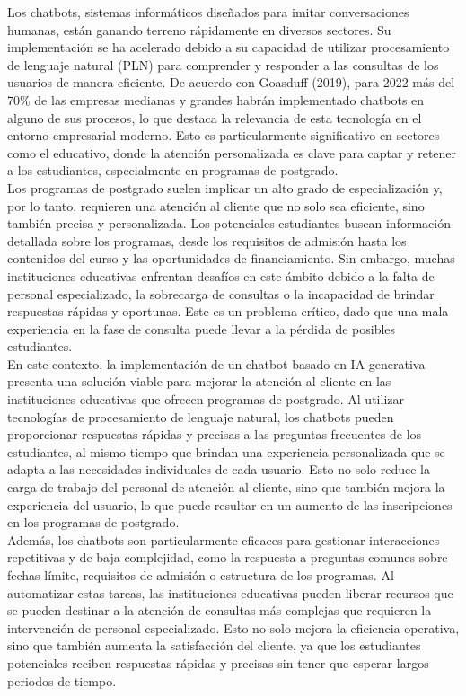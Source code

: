 \documentclass[10pt,a4paper]{article}
\begin{document}
Los chatbots, sistemas informáticos diseñados para imitar conversaciones humanas, están ganando terreno rápidamente en diversos sectores. Su implementación se ha acelerado debido a su capacidad de utilizar procesamiento de lenguaje natural (PLN) para comprender y responder a las consultas de los usuarios de manera eficiente. De acuerdo con Goasduff (2019), para 2022 más del 70\% de las empresas medianas y grandes habrán implementado chatbots en alguno de sus procesos, lo que destaca la relevancia de esta tecnología en el entorno empresarial moderno. Esto es particularmente significativo en sectores como el educativo, donde la atención personalizada es clave para captar y retener a los estudiantes, especialmente en programas de postgrado.\\

Los programas de postgrado suelen implicar un alto grado de especialización y, por lo tanto, requieren una atención al cliente que no solo sea eficiente, sino también precisa y personalizada. Los potenciales estudiantes buscan información detallada sobre los programas, desde los requisitos de admisión hasta los contenidos del curso y las oportunidades de financiamiento. Sin embargo, muchas instituciones educativas enfrentan desafíos en este ámbito debido a la falta de personal especializado, la sobrecarga de consultas o la incapacidad de brindar respuestas rápidas y oportunas. Este es un problema crítico, dado que una mala experiencia en la fase de consulta puede llevar a la pérdida de posibles estudiantes.\\

En este contexto, la implementación de un chatbot basado en IA generativa presenta una solución viable para mejorar la atención al cliente en las instituciones educativas que ofrecen programas de postgrado. Al utilizar tecnologías de procesamiento de lenguaje natural, los chatbots pueden proporcionar respuestas rápidas y precisas a las preguntas frecuentes de los estudiantes, al mismo tiempo que brindan una experiencia personalizada que se adapta a las necesidades individuales de cada usuario. Esto no solo reduce la carga de trabajo del personal de atención al cliente, sino que también mejora la experiencia del usuario, lo que puede resultar en un aumento de las inscripciones en los programas de postgrado.\\

Además, los chatbots son particularmente eficaces para gestionar interacciones repetitivas y de baja complejidad, como la respuesta a preguntas comunes sobre fechas límite, requisitos de admisión o estructura de los programas. Al automatizar estas tareas, las instituciones educativas pueden liberar recursos que se pueden destinar a la atención de consultas más complejas que requieren la intervención de personal especializado. Esto no solo mejora la eficiencia operativa, sino que también aumenta la satisfacción del cliente, ya que los estudiantes potenciales reciben respuestas rápidas y precisas sin tener que esperar largos periodos de tiempo.\\
\end{document}
